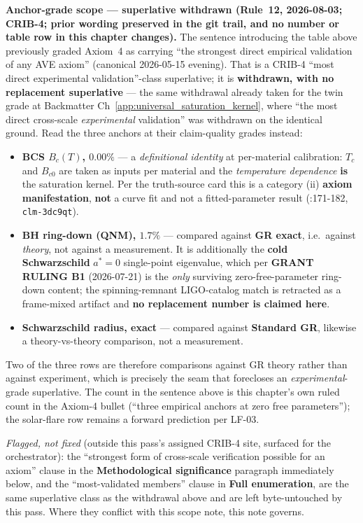 \noindent\textbf{Anchor-grade scope --- superlative withdrawn (Rule~12, 2026-08-03; CRIB-4; prior
wording preserved in the git trail, and no number or table row in this chapter changes).}
The sentence introducing the table above previously graded Axiom~4 as carrying ``the strongest
direct empirical validation of any AVE axiom'' (canonical 2026-05-15 evening). That is a CRIB-4
``most direct experimental validation''-class superlative; it is \textbf{withdrawn, with no
replacement superlative} --- the same withdrawal already taken for the twin grade at
Backmatter Ch~\ref{app:universal_saturation_kernel}, where ``the most direct cross-scale
\emph{experimental} validation'' was withdrawn on the identical ground. Read the three anchors at
their claim-quality grades instead:
\begin{itemize}
    \item \textbf{BCS $B_c(T)$, $0.00\%$} --- a \emph{definitional identity} at per-material
    calibration: $T_c$ and $B_{c0}$ are taken as inputs per material and the \emph{temperature
    dependence} \textbf{is} the saturation kernel. Per the truth-source card this is a category
    (ii) \textbf{axiom manifestation}, \textbf{not} a curve fit and not a fitted-parameter result
    (:171-182, \texttt{clm-3dc9qt}).
    \item \textbf{BH ring-down (QNM), $1.7\%$} --- compared against \textbf{GR exact}, i.e.\ against
    \emph{theory}, not against a measurement. It is additionally the \textbf{cold Schwarzschild}
    $a^{*} = 0$ single-point eigenvalue, which per \textbf{GRANT RULING B1} (2026-07-21) is the
    \emph{only} surviving zero-free-parameter ring-down content; the spinning-remnant LIGO-catalog
    match is retracted as a frame-mixed artifact and \textbf{no replacement number is claimed here}.
    \item \textbf{Schwarzschild radius, exact} --- compared against \textbf{Standard GR}, likewise a
    theory-vs-theory comparison, not a measurement.
\end{itemize}
Two of the three rows are therefore comparisons against GR theory rather than against experiment,
which is precisely the seam that forecloses an \emph{experimental}-grade superlative. The count in
the sentence above is this chapter's own ruled count in the Axiom-4 bullet
(``three empirical anchors at zero free parameters''); the solar-flare row remains a forward
prediction per LF-03.

\noindent\emph{Flagged, not fixed} (outside this pass's assigned CRIB-4 site, surfaced for the
orchestrator): the ``strongest form of cross-scale verification possible for an axiom'' clause in
the \textbf{Methodological significance} paragraph immediately below, and the ``most-validated
members'' clause in \textbf{Full enumeration}, are the same superlative class as the withdrawal
above and are left byte-untouched by this pass. Where they conflict with this scope note, this note
governs.

